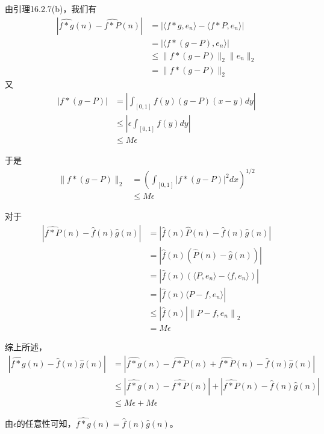\documentclass{article}
\begin{document}
\begin{itemize}
        由引理16.2.7(b)，我们有
        \begin{align*}
          \left|\widehat{f \ast g}(n) - \widehat{f \ast P}(n)\right|
           & = \left|\langle f \ast g, e_n \rangle - \langle f \ast P, e_n \rangle\right| \\
           & = \left|\langle f \ast (g - P), e_n \rangle \right|                          \\
           & \leq \|f \ast (g - P)\|_2 \|e_n\|_2                                          \\
           & = \|f \ast (g - P)\|_2
        \end{align*}
        又
        \begin{align*}
          \left| f \ast (g - P)\right|
           & = \left| \int_{[0, 1]}f(y) (g - P)(x - y) dy \right| \\
           & \leq \left| \epsilon \int_{[0, 1]}f(y) dy \right|    \\
           & \leq M \epsilon
        \end{align*}

        于是
        \begin{align*}
          \|f \ast (g - P)\|_2
           & = \left(\int_{[0, 1]} |f \ast (g - P)|^2 dx\right)^{1/2} \\
           & \leq M\epsilon
        \end{align*}

        对于
        \begin{align*}
          \left|\widehat{f \ast P}(n) - \hat{f}(n) \hat{g}(n)\right|
           & = \left|\hat{f}(n)\hat{P}(n) - \hat{f}(n) \hat{g}(n)\right|                \\
           & = \left|\hat{f}(n)(\hat{P}(n) - \hat{g}(n))\right|                         \\
           & = \left|\hat{f}(n)(\langle P, e_n \rangle - \langle f, e_n \rangle)\right| \\
           & = \left|\hat{f}(n)\langle P - f, e_n \rangle\right|                        \\
           & \leq |\hat{f}(n)|\left\|P - f, e_n \right\|_2                              \\
           & = M\epsilon
        \end{align*}

        综上所述，
        \begin{align*}
          \left|\widehat{f \ast g}(n) - \hat{f}(n) \hat{g}(n)\right|
           & = \left|\widehat{f \ast g}(n) - \widehat{f \ast P}(n) + \widehat{f \ast P}(n) - \hat{f}(n) \hat{g}(n)\right|                 \\
           & \leq \left|\widehat{f \ast g}(n) - \widehat{f \ast P}(n)\right| + \left|\widehat{f \ast P}(n) - \hat{f}(n) \hat{g}(n)\right| \\
           & \leq M \epsilon + M \epsilon
        \end{align*}

        由$\epsilon$的任意性可知，$\widehat{f \ast g}(n) = \hat{f}(n) \hat{g}(n)$。

\end{itemize}
\end{document}
